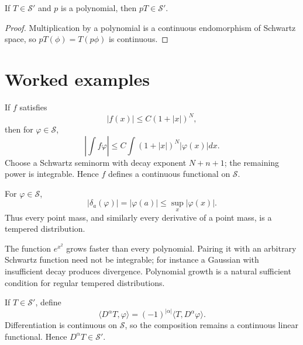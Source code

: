 \begin{theorem}\label{thm:iii18-03}
If $T\in\mathcal S'$ and $p$ is a polynomial, then $pT\in\mathcal S'$.
\begin{proof}
Multiplication by a polynomial is a continuous endomorphism of Schwartz space, so $pT(\phi)=T(p\phi)$ is continuous.
\end{proof}
\end{theorem}

\section{Worked examples}

\begin{example}\label{ex:iii18-worked-01}
If \(f\) satisfies
\[
|f(x)|\le C(1+|x|)^N,
\]
then for \(\varphi\in\mathcal S\),
\[
\left|\int f\varphi\right|
\le C\int(1+|x|)^N|\varphi(x)|dx.
\]
Choose a Schwartz seminorm with decay exponent \(N+n+1\); the remaining power
is integrable. Hence \(f\) defines a continuous functional on \(\mathcal S\).
\end{example}

\begin{example}\label{ex:iii18-worked-02}
For \(\varphi\in\mathcal S\),
\[
|\delta_a(\varphi)|=|\varphi(a)|
\le \sup_x|\varphi(x)|.
\]
Thus every point mass, and similarly every derivative of a point mass, is a
tempered distribution.
\end{example}

\begin{example}\label{ex:iii18-worked-03}
The function \(e^{x^2}\) grows faster than every polynomial. Pairing it
with an arbitrary Schwartz function need not be integrable; for instance a
Gaussian with insufficient decay produces divergence. Polynomial growth is a
natural sufficient condition for regular tempered distributions.
\end{example}

\begin{example}\label{ex:iii18-worked-04}
If \(T\in\mathcal S'\), define
\[
\langle D^\alpha T,\varphi\rangle=(-1)^{|\alpha|}
\langle T,D^\alpha\varphi\rangle.
\]
Differentiation is continuous on \(\mathcal S\), so the composition remains a
continuous linear functional. Hence \(D^\alpha T\in\mathcal S'\).
\end{example}

